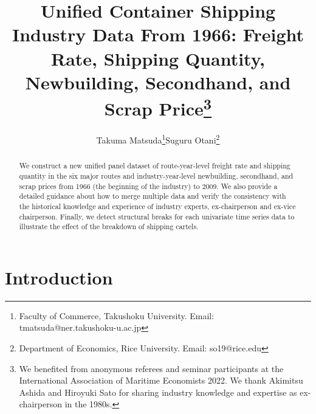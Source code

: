 \documentclass[11pt]{article}
\title{Unified Container Shipping Industry Data From 1966: Freight Rate, Shipping Quantity, Newbuilding, Secondhand, and Scrap Price\thanks{We benefited from anonymous referees and seminar participants at the International Association of Maritime Economists 2022. We thank Akimitsu Ashida and Hiroyuki Sato for sharing industry knowledge and expertise as ex-chairperson in the 1980s.}}
\author{Takuma Matsuda\thanks{Faculty of Commerce, Takushoku University. Email: tmatsuda@ner.takushoku-u.ac.jp}\quad  Suguru Otani\thanks{Department of Economics, Rice University. Email: so19@rice.edu}}
\begin{document}
\maketitle

\begin{abstract}
We construct a new unified panel dataset of route-year-level freight rate and shipping quantity in the six major routes and industry-year-level newbuilding, secondhand, and scrap prices from 1966 (the beginning of the industry) to 2009. We also provide a detailed guidance about how to merge multiple data and verify the consistency with the historical knowledge and experience of industry experts, ex-chairperson and ex-vice chairperson. Finally, we detect structural breaks for each univariate time series data to illustrate the effect of the breakdown of shipping cartels.
\end{abstract} 

\tableofcontents

\section{Introduction}\label{sec:introduction}
\end{document}
